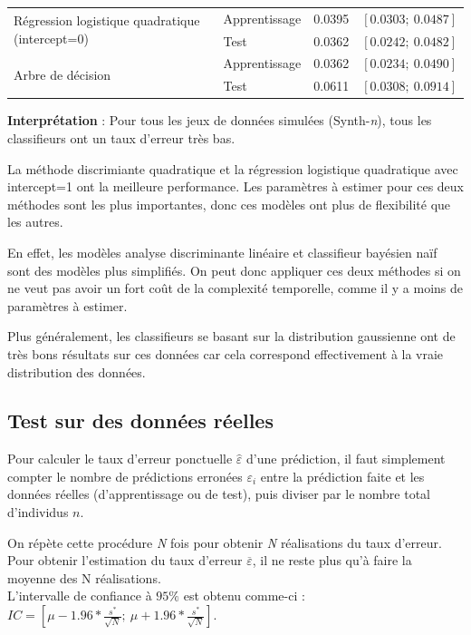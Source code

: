 \documentclass{article}
\begin{document}
\begin{table}[H]
\begin{tabular}{l|l|cc}
\multirow{2}{*}{Régression logistique quadratique (intercept=0)}                  & Apprentissage    & 0.0395                             & $\left[0.0303 ;~ 0.0487\right]$  \\
                                       & Test             & 0.0362                                 & $\left[0.0242 ;~ 0.0482 \right]$ \\ \hline      
\multirow{2}{*}{Arbre de décision}                  & Apprentissage    & 0.0362                            & $\left[ 0.0234;~ 0.0490 \right]$  \\
                                       & Test             & 0.0611                                 & $\left[0.0308 ;~ 0.0914 \right]$ 
\end{tabular}


\label{err_3-1000}
\end{table}
\textbf{Interprétation }: Pour tous les jeux de données simulées (Synth-\textit{n}), tous les classifieurs ont un taux d'erreur très bas.

La méthode discrimiante quadratique et la régression logistique quadratique avec intercept=1 ont la meilleure performance. Les paramètres à estimer pour ces deux méthodes sont les plus importantes, donc ces modèles ont plus de flexibilité que les autres.

En effet, les modèles analyse discriminante linéaire et classifieur bayésien naïf sont des modèles plus simplifiés. On peut donc appliquer ces deux méthodes si on ne veut pas avoir un fort coût de la complexité temporelle, comme il y a moins de paramètres à estimer.

Plus généralement, les classifieurs se basant sur la distribution gaussienne ont de très bons résultats sur ces données car cela correspond effectivement à la vraie distribution des données.




\subsection{Test sur des données réelles}

Pour calculer le taux d'erreur ponctuelle $ \widehat{\varepsilon}$ d'une prédiction, il faut simplement compter le nombre de prédictions erronées $\varepsilon_{i}$ entre la prédiction faite et les données réelles (d'apprentissage ou de test), puis diviser par le nombre total d'individus $n$.

On répète cette procédure \textit{N} fois pour obtenir \textit{N} réalisations du taux d'erreur.
Pour obtenir l'estimation du taux d'erreur $ \overline{\varepsilon}$, il ne reste plus qu'à faire la moyenne des N réalisations.\\
L'intervalle de confiance à $95\%$ est obtenu comme-ci : $IC= \left[ \mu -1.96* \frac{s^*}{\sqrt{N} } ;~  \mu +1.96* \frac{s^*}{\sqrt{N} }   \right]$. 
\end{document}
